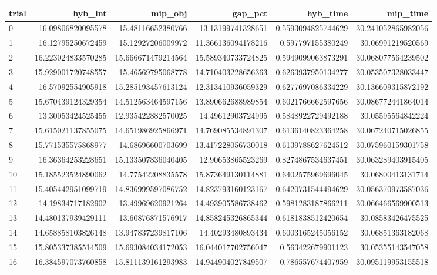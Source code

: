 \begin{tabular}{lrrrrr}
\hline
trial & hyb_int & mip_obj & gap_pct & hyb_time & mip_time \\ \hline
0 & 16.09806820095578 & 15.48116652380766 & 13.13199741328651 & 0.5593094825744629 & 30.241052865982056 \\
1 & 16.12795250672459 & 15.12927206009972 & 11.366136094178216 & 0.597797155380249 & 30.06991219520569 \\
2 & 16.223024833570285 & 15.666671479214564 & 15.589340733724825 & 0.5949099063873291 & 30.068077564239502 \\
3 & 15.929001720748557 & 15.46569795068778 & 14.710403228656363 & 0.6263937950134277 & 30.053507328033447 \\
4 & 16.57092554905918 & 15.285193457613124 & 12.313410936059329 & 0.6277697086334229 & 30.136609315872192 \\
5 & 15.670439124329354 & 14.512563464597156 & 13.890662688989854 & 0.6021766662597656 & 30.086772441864014 \\
6 & 13.30053424525455 & 12.935422882570025 & 14.49612903724995 & 0.5848922729492188 & 30.05595564842224 \\
7 & 15.615021137855075 & 14.651986925866971 & 14.769085534891307 & 0.6136140823364258 & 30.067240715026855 \\
8 & 15.771535575868977 & 14.68696600703699 & 13.417228056730018 & 0.6139788627624512 & 30.075960159301758 \\
9 & 16.36364253228651 & 15.133507836040405 & 12.90653865523269 & 0.8274867534637451 & 30.063289403915405 \\
10 & 15.185523524890062 & 14.77542208835578 & 15.873649130114881 & 0.6402575969696045 & 30.06800413131714 \\
11 & 15.405442951099719 & 14.836999597086752 & 14.823793160123167 & 0.6420731544494629 & 30.056370973587036 \\
12 & 14.19834717182902 & 13.49969620921264 & 14.493905586738462 & 0.5981283187866211 & 30.066466569900513 \\
13 & 14.480137939429111 & 13.60876871576917 & 14.858245326865344 & 0.6181838512420654 & 30.08583426475525 \\
14 & 14.658858103826148 & 13.947837239817106 & 14.40293480893434 & 0.6003165245056152 & 30.06851363182068 \\
15 & 15.805337385514509 & 15.693084034172053 & 16.044017702756047 & 0.563422679901123 & 30.05355143547058 \\
16 & 16.384597073760858 & 15.811139161293983 & 14.944904027849507 & 0.786557674407959 & 30.095119953155518 \\

\end{tabular}
